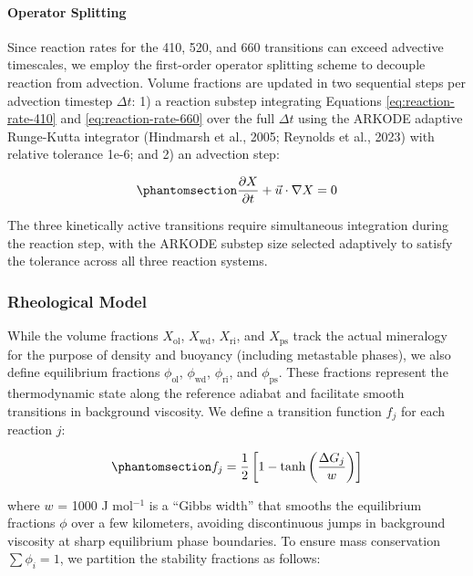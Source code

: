 \documentclass[draft,linenumbers]{agujournal2019}
\begin{document}
\paragraph{Operator Splitting}\label{sec:operator-splitting}

Since reaction rates for the 410, 520, and 660 transitions can exceed
advective timescales, we employ the first-order operator splitting
scheme to decouple reaction from advection. Volume fractions are updated
in two sequential steps per advection timestep \(\Delta t\): 1) a
reaction substep integrating Equations \ref{eq:reaction-rate-410} and
\ref{eq:reaction-rate-660} over the full \(\Delta t\) using the ARKODE
adaptive Runge-Kutta integrator (Hindmarsh et al., 2005; Reynolds et
al., 2023) with relative tolerance 1e-6; and 2) an advection step:

\begin{equation}\protect\phantomsection\label{eq:composition}{\frac{\partial X}{\partial t} + \vec{u} \cdot \nabla X = 0}\end{equation}

The three kinetically active transitions require simultaneous
integration during the reaction step, with the ARKODE substep size
selected adaptively to satisfy the tolerance across all three reaction
systems.

\subsubsection{Rheological Model}\label{sec:rheological-model}

While the volume fractions \(X_\mathrm{ol}\), \(X_\mathrm{wd}\),
\(X_\mathrm{ri}\), and \(X_\mathrm{ps}\) track the actual mineralogy for
the purpose of density and buoyancy (including metastable phases), we
also define equilibrium fractions \(\phi_\mathrm{ol}\),
\(\phi_\mathrm{wd}\), \(\phi_\mathrm{ri}\), and \(\phi_\mathrm{ps}\).
These fractions represent the thermodynamic state along the reference
adiabat and facilitate smooth transitions in background viscosity. We
define a transition function \(f_j\) for each reaction \(j\):

\begin{equation}\protect\phantomsection\label{eq:transition-function}{f_j = \frac{1}{2} \left[ 1 - \tanh \left( \frac{\Delta G_j}{w} \right) \right]}\end{equation}

where \(w\) = 1000 J mol\(^{-1}\) is a ``Gibbs width'' that smooths the
equilibrium fractions \(\phi\) over a few kilometers, avoiding
discontinuous jumps in background viscosity at sharp equilibrium phase
boundaries. To ensure mass conservation \(\sum \phi_i = \text{1}\), we
partition the stability fractions as follows:
\end{document}
